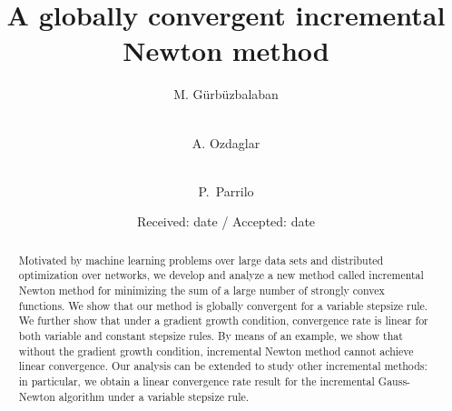 \documentclass[final,numbook]{svjour3}
\begin{document}
\title{A globally convergent incremental Newton method
}


\author{M. G\"urb\"uzbalaban \and \\ A. Ozdaglar \and \\ P.~Parrilo}


\date{Received: date / Accepted: date}

\maketitle

\begin{abstract}
Motivated by machine learning problems over large data sets and distributed optimization over networks,
we develop and analyze a new method called incremental Newton method for minimizing the sum of a large number of strongly convex functions. We show that our method is globally convergent for a variable stepsize rule. We further show that under a gradient growth condition, convergence rate is linear  for both  variable and constant stepsize rules. By means of an example, we show that without the gradient growth condition, incremental Newton method cannot achieve linear convergence. Our analysis can be extended to study other incremental methods: in particular, we obtain a linear convergence rate result for the incremental Gauss-Newton algorithm under a variable stepsize rule.
\end{abstract}
\end{document}
